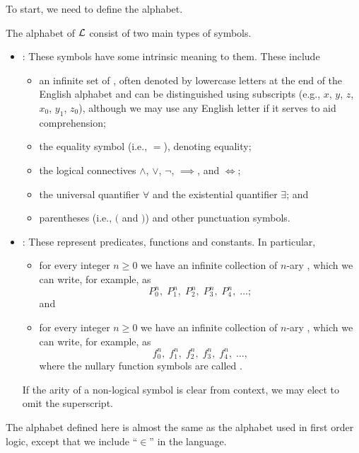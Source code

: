 To start, we need to define the alphabet.

\begin{definition}
    The alphabet of $\mathcal{L}$ consist of two main types of symbols.
    \begin{itemize}
        \item {}: These symbols have some intrinsic meaning to them. These include
        \begin{itemize}
            \item an infinite set of , often denoted by lowercase letters at the end of the English alphabet and can be distinguished using subscripts (e.g., $x$, $y$, $z$, $x_0$, $y_1$, $z_0$), although we may use any English letter if it serves to aid comprehension;
            \item the equality symbol (i.e., $=$), denoting equality;
            \item the logical connectives $\land$, $\lor$, $\lnot$, $\implies$, and $\iff$;
            \item the universal quantifier $\forall$ and the existential quantifier $\exists$; and
            \item parentheses (i.e., $($ and $)$) and other punctuation symbols.
        \end{itemize}
        \item {}: These represent predicates, functions and constants. In particular,
        \begin{itemize}
            \item for every integer $n \geq 0$ we have an infinite collection of $n$-ary , which we can write, for example, as
            \[
                P_0^n,\;P_1^n,\;P_2^n,\;P_3^n,\;P_4^n,\;\dots;
            \]
            and
            \item for every integer $n \geq 0$ we have an infinite collection of $n$-ary , which we can write, for example, as
            \[
                f_0^n,\;f_1^n,\;f_2^n,\;f_3^n,\;f_4^n,\;\dots,
            \]
            where the nullary function symbols are called .
        \end{itemize}
        If the arity of a non-logical symbol is clear from context, we may elect to omit the superscript.
    \end{itemize}
\end{definition}
\begin{remark}
    The alphabet defined here is almost the same as the alphabet used in first order logic, except that we include ``$\in$'' in the language.
\end{remark}

